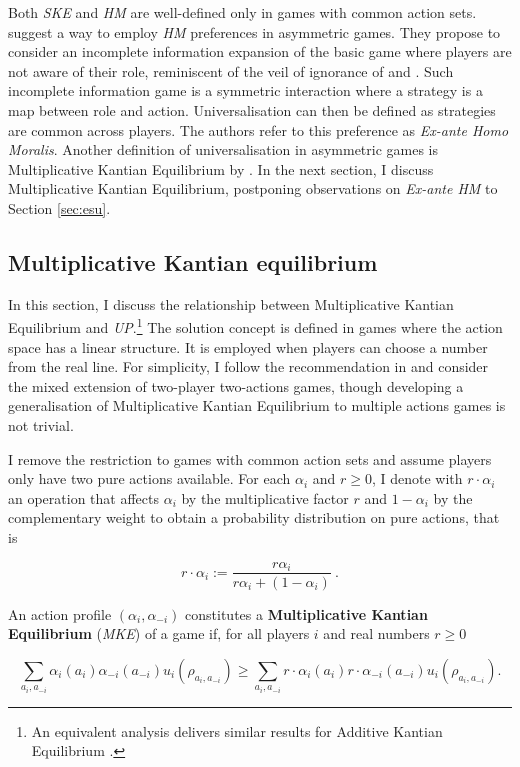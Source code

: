 Both \textit{SKE} and \textit{HM} are well-defined only in games with common action sets. \cite{algerHomoMoralisPreference2013} suggest a way to employ \textit{HM} preferences in asymmetric games. They propose to consider an incomplete information expansion of the basic game where players are not aware of their role, reminiscent of the veil of ignorance of \cite{harsanyiCardinalWelfareIndividualistic1955} and \cite{rawlsTheoryJustice1971}. Such incomplete information game is a symmetric interaction where a strategy is a map between role and action. Universalisation can then be defined as strategies are common across players. The authors refer to this preference as \textit{Ex-ante Homo Moralis}. Another definition of universalisation in asymmetric games is Multiplicative Kantian Equilibrium by \cite{roemer2019we}. In the next section, I discuss Multiplicative Kantian Equilibrium, postponing observations on \textit{Ex-ante HM} to Section \ref{sec:esu}.

\subsection{Multiplicative Kantian equilibrium}\label{sec:mult}

In this section, I discuss the relationship between Multiplicative Kantian Equilibrium and \textit{UP}.\footnote{An equivalent analysis delivers similar results for Additive Kantian Equilibrium \citep{roemer2019we}.} The solution concept is defined in games where the action space has a linear structure. It is employed when players can choose a number from the real line. For simplicity, I follow the recommendation in \citet[p. 42]{roemer2019we} and consider the mixed extension of two-player two-actions games, though developing a generalisation of Multiplicative Kantian Equilibrium to multiple actions games is not trivial.

I remove the restriction to games with common action sets and assume players only have two pure actions available. For each \( \alpha_i \) and \( r \geq 0 \), I denote with \( r \cdot \alpha_i \) an operation that affects \( \alpha_i \) by the multiplicative factor \( r \) and \( 1 - \alpha_i \) by the complementary weight to obtain a probability distribution on pure actions, that is

\[ r \cdot \alpha_i :=\frac{r \alpha_i }{r \alpha_i +(1-\alpha_i)} \: .\]

\begin{definition}
	An action profile \( (\alpha_i, \alpha_{-i} ) \) constitutes a \textbf{Multiplicative Kantian Equilibrium} (\textit{MKE}) of a game if, for all players \( i \) and real numbers \( r \geq 0 \)

	\[
		\sum_{a_i, a_{-i}} \alpha_{i} (a_i) \alpha_{-i} (a_{-i}) u_i(\rho_{a_i, a_{-i}}) \geq \sum_{a_i, a_{-i}} r \cdot \alpha_{i} (a_i) r \cdot \alpha_{-i} (a_{-i}) u_i(\rho_{a_i, a_{-i}}).
	\]
\end{definition}


